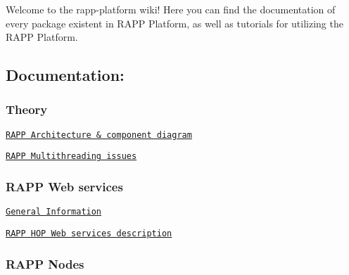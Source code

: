 Welcome to the rapp-\/platform wiki! Here you can find the documentation of every package existent in R\-A\-P\-P Platform, as well as tutorials for utilizing the R\-A\-P\-P Platform.

\subsection*{Documentation\-:}

\subsubsection*{Theory}


\begin{DoxyItemize}
\item \href{https://github.com/rapp-project/rapp-platform/wiki/RAPP-Architecture}{\tt R\-A\-P\-P Architecture \& component diagram}
\item \href{https://github.com/rapp-project/rapp-platform/wiki/RAPP-Multithreading-issues}{\tt R\-A\-P\-P Multithreading issues}
\end{DoxyItemize}

\subsubsection*{R\-A\-P\-P Web services}


\begin{DoxyItemize}
\item \href{https://github.com/rapp-project/rapp-platform/wiki/HOP-Services---General-Information}{\tt General Information}
\item \href{https://github.com/rapp-project/rapp-platform/wiki/RAPP-HOP-Web-services}{\tt R\-A\-P\-P H\-O\-P Web services description}
\end{DoxyItemize}

\subsubsection*{R\-A\-P\-P Nodes}



